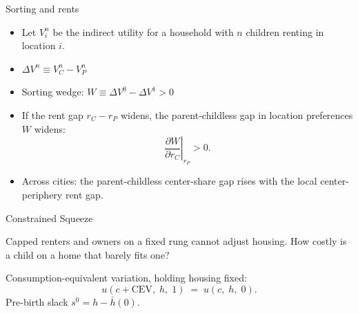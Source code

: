 \documentclass[11pt,aspectratio=169]{beamer}
\begin{document}
\begin{frame}{Sorting and rents}
\label{slide2-main}

\footnotesize
\begin{itemize}
\item Let $V_i^n$ be the indirect utility for a household with $n$ children renting in location $i$.
\item $\Delta V^n \equiv V_C^n - V_P^n$
\item Sorting wedge: $W \equiv \Delta V^0 - \Delta V^1 > 0$
\item If the rent gap $r_C - r_P$ widens, the parent-childless gap in location preferences $W$ widens:
\[
\left.\frac{\partial W}{\partial r_C}\right|_{r_P} > 0.
\]
\end{itemize}




\begin{itemize}\setlength\itemsep{-1pt}
  \item Across cities: the parent-childless center-share gap rises with the local center-periphery rent gap.
\end{itemize}

\end{frame}

\begin{frame}{Constrained Squeeze \; \hyperlink{app:lem3-cev}{}}
\label{lem3-main}

\footnotesize

Capped renters and owners on a fixed rung cannot adjust housing. How costly is a child on a home that barely fits one?

\vspace{0.2em}
Consumption-equivalent variation, holding housing fixed:
\vspace{-0.4em}
\[
u(c + \mathrm{CEV},\; h,\; 1) \;=\; u(c,\; h,\; 0).
\]
\vspace{-0.6em}
Pre-birth slack $s^0 = h - \bar h(0)$.

\vspace{0.2em}
\centering
{}
\end{frame}
\end{document}
